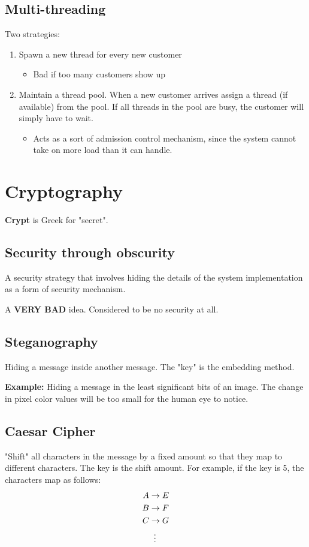 \documentclass[twoside]{article}
\begin{document}
\subsection{Multi-threading}
Two strategies:
\begin{enumerate}
    \item Spawn a new thread for every new customer
        \begin{itemize}
            \item Bad if too many customers show up
        \end{itemize}
    \item Maintain a thread pool. When a new customer arrives assign a thread (if available) from the pool. If all threads in the pool are busy, the customer will simply have to wait.
    \begin{itemize}
        \item Acts as a sort of admission control mechanism, since the system cannot take on more load than it can handle.
    \end{itemize}
\end{enumerate}

\section{Cryptography}
\textbf{Crypt} is Greek for "secret".

\subsection{Security through obscurity}
A security strategy that involves hiding the details of the system implementation as a form of security mechanism.

A \textbf{VERY BAD} idea. Considered to be no security at all.

\subsection{Steganography}
Hiding a message inside another message. The "key" is the embedding method.

\textbf{Example:} Hiding a message in the least significant bits of an image. The change in pixel color values will be too small for the human eye to notice.

\subsection{Caesar Cipher}
"Shift" all characters in the message by a fixed amount so that they map to different characters. The key is the shift amount. For example, if the key is 5, the characters map as follows:
\begin{align}
    A &\rightarrow E\\
    B &\rightarrow F\\
    C &\rightarrow G\\
    &\;\;\vdots \notag
\end{align}
\end{document}
